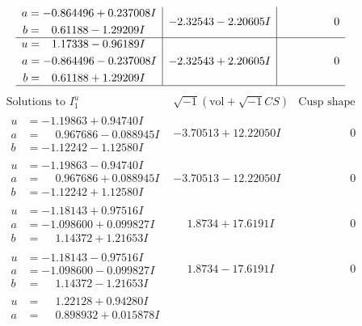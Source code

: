 \documentclass[1p]{elsarticle_modified}
\theoremstyle{definition}
\newcommand{\I}{\sqrt{-1}}
\begin{document}
$$\begin{array}{c|c|c}
\begin{aligned}
a &= -0.864496 + 0.237008 I \\
b &= \phantom{-}0.61188 - 1.29209 I\end{aligned}
 & -2.32543 - 2.20605 I & \phantom{-0.000000 } 0 \\ \hline\begin{aligned}
u &= \phantom{-}1.17338 - 0.96189 I \\
a &= -0.864496 - 0.237008 I \\
b &= \phantom{-}0.61188 + 1.29209 I\end{aligned}
 & -2.32543 + 2.20605 I & \phantom{-0.000000 } 0\\
 \hline 
 \end{array}$$\newpage$$\begin{array}{c|c|c}  
\text{Solutions to }I^u_{1}& \I (\text{vol} + \sqrt{-1}CS) & \text{Cusp shape}\\
 \hline 
\begin{aligned}
u &= -1.19863 + 0.94740 I \\
a &= \phantom{-}0.967686 - 0.088945 I \\
b &= -1.12242 - 1.12580 I\end{aligned}
 & -3.70513 + 12.22050 I & \phantom{-0.000000 } 0 \\ \hline\begin{aligned}
u &= -1.19863 - 0.94740 I \\
a &= \phantom{-}0.967686 + 0.088945 I \\
b &= -1.12242 + 1.12580 I\end{aligned}
 & -3.70513 - 12.22050 I & \phantom{-0.000000 } 0 \\ \hline\begin{aligned}
u &= -1.18143 + 0.97516 I \\
a &= -1.098600 + 0.099827 I \\
b &= \phantom{-}1.14372 + 1.21653 I\end{aligned}
 & \phantom{-}1.8734 + 17.6191 I & \phantom{-0.000000 } 0 \\ \hline\begin{aligned}
u &= -1.18143 - 0.97516 I \\
a &= -1.098600 - 0.099827 I \\
b &= \phantom{-}1.14372 - 1.21653 I\end{aligned}
 & \phantom{-}1.8734 - 17.6191 I & \phantom{-0.000000 } 0 \\ \hline\begin{aligned}
u &= \phantom{-}1.22128 + 0.94280 I \\
a &= \phantom{-}0.898932 + 0.015878 I \\

\end{aligned}
\end{array}$$
\end{document}
